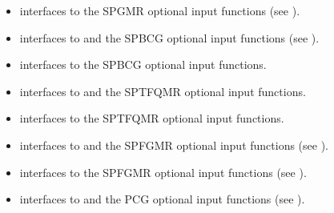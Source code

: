 \documentclass[letterpaper,10pt,english]{sphinxmanual}
\begin{document}
\begin{itemize}
\item {} 
{\hyperref[f_interface/Usage:f/_/FARKSPGMRREINIT]{\emph{}}} interfaces to the SPGMR optional input
functions (see {\hyperref[c_interface/User_callable:cinterface-arkspilsinputtable]{\emph{}}}).

\item {} 
{\hyperref[f_interface/Usage:f/_/FARKSPBCG]{\emph{}}} interfaces to {\hyperref[c_interface/User_callable:c.ARKSpbcg]{\emph{}}} and the SPBCG optional input
functions (see {\hyperref[c_interface/User_callable:cinterface-arkspilsinputtable]{\emph{}}}).

\item {} 
{\hyperref[f_interface/Usage:f/_/FARKSPBCGREINIT]{\emph{}}} interfaces to the SPBCG optional input
functions.

\item {} 
{\hyperref[f_interface/Usage:f/_/FARKSPTFQMR]{\emph{}}} interfaces to {\hyperref[c_interface/User_callable:c.ARKSptfqmr]{\emph{}}} and the SPTFQMR optional
input functions.

\item {} 
{\hyperref[f_interface/Usage:f/_/FARKSPTFQMRREINIT]{\emph{}}} interfaces to the SPTFQMR optional input
functions.

\item {} 
{\hyperref[f_interface/Usage:f/_/FARKSPFGMR]{\emph{}}} interfaces to {\hyperref[c_interface/User_callable:c.ARKSpfgmr]{\emph{}}} and the SPFGMR optional input
functions (see {\hyperref[c_interface/User_callable:cinterface-arkspilsinputtable]{\emph{}}}).

\item {} 
{\hyperref[f_interface/Usage:f/_/FARKSPFGMRREINIT]{\emph{}}} interfaces to the SPFGMR optional input
functions (see {\hyperref[c_interface/User_callable:cinterface-arkspilsinputtable]{\emph{}}}).

\item {} 
{\hyperref[f_interface/Usage:f/_/FARKPCG]{\emph{}}} interfaces to {\hyperref[c_interface/User_callable:c.ARKPcg]{\emph{}}} and the PCG optional input
functions (see {\hyperref[c_interface/User_callable:cinterface-arkspilsinputtable]{\emph{}}}).


\end{itemize}
\end{document}
